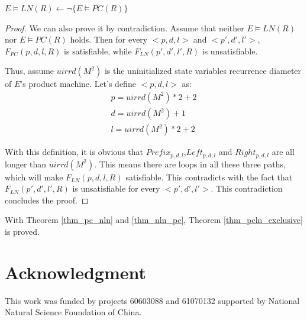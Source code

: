 \documentclass[journal]{IEEEtran}
\begin{document}
\begin{theorem}\label{thm_nln_pc}
$E\vDash LN(R)\gets \neg \{E\vDash PC(R)\}$
\end{theorem}
\begin{proof}
We can also prove it by contradiction.
Assume that neither $E\vDash LN(R)$ nor $E\vDash PC(R)$ holds.
Then for every $<p,d,l>$ and $<p',d',l'>$,
$F_{PC}(p,d,l,R)$ is satisfiable,
while $F_{LN}(p',d',l',R)$ is unsatisfiable.

Thus,
assume $uirrd(M^2)$ is the uninitialized state variables recurrence diameter of $E$'s product machine.
Let's define $<p,d,l>$ as:
\begin{equation}
\begin{array}{c}
p=uirrd(M^2)*2+2 \\
d=uirrd(M^2)+1 \\
l=uirrd(M^2)*2+2
\end{array}
\end{equation}

With this definition,
it is obvious that $Prefix_{p,d,l}$,$Left_{p,d,l}$ and $Right_{p,d,l}$ are all longer than $uirrd(M^2)$.
This means there are loops in all these three paths,
which will make $F_{LN}(p,d,l,R)$ satisfiable.
This contradicts with the fact that $F_{LN}(p',d',l',R)$ is unsatisfiable for every $<p',d',l'>$.
This contradiction concludes the proof.
\end{proof}

With Theorem \ref{thm_pc_nln} and \ref{thm_nln_pc},
Theorem \ref{thm_pcln_exclusive} is proved.

\section*{Acknowledgment}

This work was funded by projects 60603088 and 61070132 supported by National Natural Science Foundation of China.





\ifCLASSOPTIONcaptionsoff
  \newpage
\fi
\end{document}
